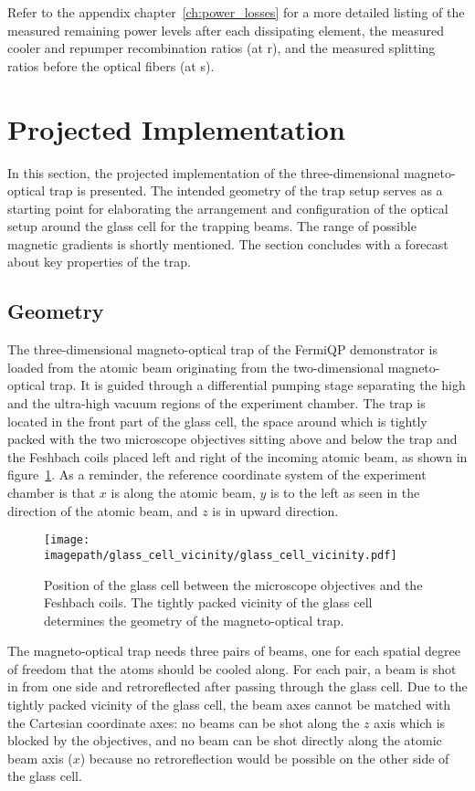 Refer to the appendix chapter~\ref{ch:power_losses} for a more detailed listing of the  measured remaining power levels after each dissipating element, the measured cooler and repumper recombination ratios (at r), and the measured splitting ratios before the optical fibers (at s).


\section{Projected Implementation}\label{ch:projected_implementation}
In this section, the projected implementation of the three-dimensional magneto-optical trap is presented. The intended geometry of the trap setup serves as a starting point for elaborating the arrangement and configuration of the optical setup around the glass cell for the trapping beams. The range of possible magnetic gradients is shortly mentioned. The section concludes with a forecast about key properties of the trap.

\subsection*{Geometry}
The three-dimensional magneto-optical trap of the FermiQP demonstrator is loaded from the atomic beam originating from the two-dimensional magneto-optical trap. It is guided through a differential pumping stage separating the high and the ultra-high vacuum regions of the experiment chamber. The trap is located in the front part of the glass cell, the space around which is tightly packed with the two microscope objectives sitting above and below the trap and the Feshbach coils placed left and right of the incoming atomic beam, as shown in figure~\ref{fig:glass_cell_vicinity}. As a reminder, the reference coordinate system of the experiment chamber is that $x$ is along the atomic beam, $y$ is to the left as seen in the direction of the atomic beam, and $z$ is in upward direction.

\begin{figure}
    \centering
    \texttt{[image: \\imagepath/glass\_cell\_vicinity/glass\_cell\_vicinity.pdf]}
    \caption{Position of the glass cell between the microscope objectives and the Feshbach coils. The tightly packed vicinity of the glass cell determines the geometry of the magneto-optical trap.}\label{fig:glass_cell_vicinity}
\end{figure}

The magneto-optical trap needs three pairs of beams, one for each spatial degree of freedom that the atoms should be cooled along. For each pair, a beam is shot in from one side and retroreflected after passing through the glass cell. Due to the tightly packed vicinity of the glass cell, the beam axes cannot be matched with the Cartesian coordinate axes: no beams can be shot along the $z$ axis which is blocked by the objectives, and no beam can be shot directly along the atomic beam axis ($x$) because no retroreflection would be possible on the other side of the glass cell.

